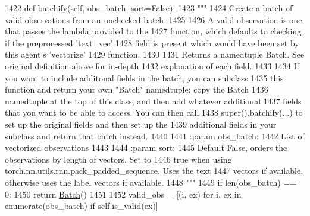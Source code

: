 \begin{DoxyCode}
1422     \textcolor{keyword}{def }\hyperlink{namespaceparlai_1_1agents_1_1drqa_1_1utils_aca22dd97c5b6dcda2a7479c1cb22ef1e}{batchify}(self, obs\_batch, sort=False):
1423         \textcolor{stringliteral}{"""}
1424 \textcolor{stringliteral}{        Create a batch of valid observations from an unchecked batch.}
1425 \textcolor{stringliteral}{}
1426 \textcolor{stringliteral}{        A valid observation is one that passes the lambda provided to the}
1427 \textcolor{stringliteral}{        function, which defaults to checking if the preprocessed 'text\_vec'}
1428 \textcolor{stringliteral}{        field is present which would have been set by this agent's 'vectorize'}
1429 \textcolor{stringliteral}{        function.}
1430 \textcolor{stringliteral}{}
1431 \textcolor{stringliteral}{        Returns a namedtuple Batch. See original definition above for in-depth}
1432 \textcolor{stringliteral}{        explanation of each field.}
1433 \textcolor{stringliteral}{}
1434 \textcolor{stringliteral}{        If you want to include additonal fields in the batch, you can subclass}
1435 \textcolor{stringliteral}{        this function and return your own "Batch" namedtuple: copy the Batch}
1436 \textcolor{stringliteral}{        namedtuple at the top of this class, and then add whatever additional}
1437 \textcolor{stringliteral}{        fields that you want to be able to access. You can then call}
1438 \textcolor{stringliteral}{        super().batchify(...) to set up the original fields and then set up the}
1439 \textcolor{stringliteral}{        additional fields in your subclass and return that batch instead.}
1440 \textcolor{stringliteral}{}
1441 \textcolor{stringliteral}{        :param obs\_batch:}
1442 \textcolor{stringliteral}{            List of vectorized observations}
1443 \textcolor{stringliteral}{}
1444 \textcolor{stringliteral}{        :param sort:}
1445 \textcolor{stringliteral}{            Default False, orders the observations by length of vectors. Set to}
1446 \textcolor{stringliteral}{            true when using torch.nn.utils.rnn.pack\_padded\_sequence.  Uses the text}
1447 \textcolor{stringliteral}{            vectors if available, otherwise uses the label vectors if available.}
1448 \textcolor{stringliteral}{        """}
1449         \textcolor{keywordflow}{if} len(obs\_batch) == 0:
1450             \textcolor{keywordflow}{return} \hyperlink{namespaceparlai_1_1agents_1_1legacy__agents_1_1seq2seq_1_1torch__agent__v1_a74cfde390a2b9861179ac0fcd59da28c}{Batch}()
1451 
1452         valid\_obs = [(i, ex) \textcolor{keywordflow}{for} i, ex \textcolor{keywordflow}{in} enumerate(obs\_batch) \textcolor{keywordflow}{if} self.is\_valid(ex)]

\end{DoxyCode}
